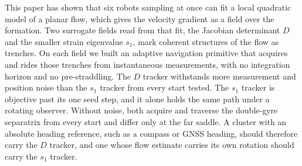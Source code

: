 \documentclass[lettersize,journal]{IEEEtran}
\begin{document}
This paper has shown that six robots sampling at once can fit a local
quadratic model of a planar flow, which gives the velocity gradient as a
field over the formation. Two surrogate fields read from that fit, the
Jacobian determinant $D$ and the smaller strain eigenvalue $s_1$, mark
coherent structures of the flow as trenches. On each field we built an
adaptive navigation primitive that acquires and rides those trenches from
instantaneous measurements, with no integration horizon and no
pre-straddling. The $D$ tracker withstands more measurement and position
noise than the $s_1$ tracker from every start tested. The $s_1$ tracker is
objective past its one seed step, and it alone holds the same path under a
rotating observer. Without noise, both acquire and traverse the
double-gyre separatrix from every start and differ only at the far saddle.
A cluster with an absolute heading reference, such as a compass or GNSS
heading, should therefore carry the $D$ tracker, and one whose flow
estimate carries its own rotation should carry the $s_1$ tracker.
\end{document}
